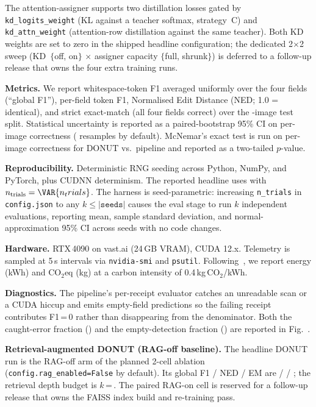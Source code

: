 The attention-assigner supports two distillation losses gated by
\texttt{kd\_logits\_weight} (KL against a teacher softmax,
strategy~C) and \texttt{kd\_attn\_weight} (attention-row
distillation against the same teacher).  Both KD weights are set to
zero in the shipped headline configuration; the dedicated 2$\times$2
sweep (KD~$\{$off, on$\}$ $\times$ assigner capacity $\{$full,
shrunk$\}$) is deferred to a follow-up release that owns the four
extra training runs.



\textbf{Metrics.}  We report whitespace-token F1 averaged uniformly
over the four fields (``global F1''), per-field token F1, Normalised
Edit Distance (NED; 1.0 = identical), and strict exact-match (all
four fields correct) over the -image test split.  Statistical
uncertainty is reported as a paired-bootstrap 95\% CI on per-image
correctness ( resamples by default).  McNemar's
exact test is run on per-image correctness for DONUT vs.\ pipeline
and reported as a two-tailed $p$-value.

\textbf{Reproducibility.}  Deterministic RNG seeding across Python,
NumPy, and PyTorch, plus CUDNN determinism.  The reported headline
uses  with
$n_{\text{trials}}=\VAR{n_trials}$.  The harness is seed-parametric:
increasing \texttt{n\_trials} in \texttt{config.json} to any
$k\le|\texttt{seeds}|$ causes the eval stage to run $k$ independent
evaluations, reporting mean, sample standard deviation, and
normal-approximation 95\% CI across seeds with no code changes.

\textbf{Hardware.}  RTX\,4090 on vast.ai (24\,GB VRAM), CUDA 12.x.
Telemetry is sampled at 5\,s intervals via \texttt{nvidia-smi} and
\texttt{psutil}.  Following~\cite{strubell2019energy}, we report
energy (kWh) and CO$_2$eq (kg) at a carbon intensity of
0.4\,kg\,CO$_2$/kWh.

\textbf{Diagnostics.}  The pipeline's per-receipt evaluator catches
an unreadable scan or a CUDA hiccup and emits empty-field predictions
so the failing receipt contributes F1\,=\,0 rather than disappearing
from the denominator.  Both the caught-error fraction
() and the empty-detection fraction
() are reported in
Fig.~.

\textbf{Retrieval-augmented DONUT (RAG-off baseline).}  The headline
DONUT run is the RAG-off arm of the planned 2-cell ablation
(\texttt{config.rag\_enabled=False} by default).  Its global F1 / NED
/ EM are  /  / ; the
retrieval depth budget is $k$\,=\,.  The paired RAG-on cell
is reserved for a follow-up release that owns the FAISS index build
and re-training pass.


